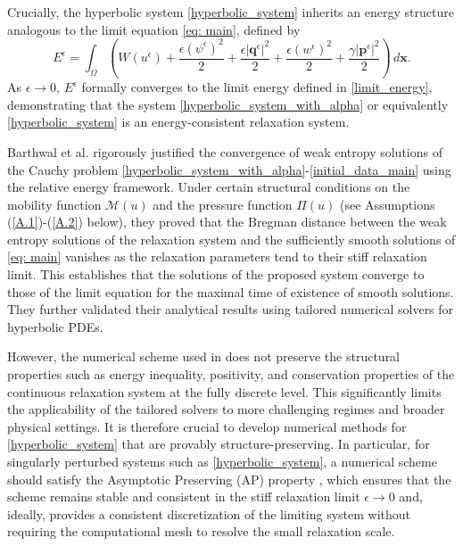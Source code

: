 \documentclass[11pt]{article}
\numberwithin{equation}{section}
\newtheorem{counter example}[theorem]{Counter Example}
\numberwithin{equation}{section}
\numberwithin{equation}{section}
\newcommand{\rel}{^{\epsilon}}
\begin{document}
Crucially, the hyperbolic system \eqref{hyperbolic_system} inherits an energy structure analogous to the limit equation \eqref{eq: main}, defined by 
\begin{equation}\label{convex-energy}
    E^{\epsilon} =\displaystyle\int_{\Omega} \left(W(u\rel)+\dfrac{\epsilon({\psi\rel})^2}{2}+\dfrac{\epsilon {|\mathbf{q}\rel|}^2}{2}+\dfrac{\epsilon (w\rel)^2}{2}+\dfrac{\gamma {|\mathbf{p}\rel|}^2}{2}\right)\, d\mathbf{x}. 
\end{equation}
As $\epsilon \to 0$, $E^{\epsilon}$ formally converges to the limit energy defined in \eqref{limit_energy}, demonstrating that the system \eqref{hyperbolic_system_with_alpha} or equivalently \eqref{hyperbolic_system} is an energy-consistent relaxation system. 

Barthwal et al. \cite{barthwal2026energy} rigorously justified the convergence of weak entropy solutions of the Cauchy problem \eqref{hyperbolic_system_with_alpha}-\eqref{initial_data_main} using the relative energy framework. Under certain structural conditions on the mobility function $\mathcal{M}(u)$ and the pressure function $\Pi(u)$ (see Assumptions (\ref{A.1})-(\ref{A.2}) below), they proved that the Bregman distance between the weak entropy solutions of the relaxation system and the sufficiently smooth solutions of \eqref{eq: main} vanishes as the relaxation parameters tend to their stiff relaxation limit. This establishes that the solutions of the proposed system converge to those of the limit equation for the maximal time of existence of smooth solutions. They further validated their analytical results using tailored numerical solvers for hyperbolic PDEs.

However, the numerical scheme used in \cite{barthwal2026energy} does not preserve the structural properties such as energy inequality, positivity, and conservation properties of the continuous relaxation system at the fully discrete level. This significantly limits the applicability of the tailored solvers to more challenging regimes and broader physical settings. It is therefore crucial to develop numerical methods for \eqref{hyperbolic_system} that are provably structure-preserving. In particular, for singularly perturbed systems such as \eqref{hyperbolic_system}, a numerical scheme should satisfy the Asymptotic Preserving (AP) property \cite{Jin99}, which ensures that the scheme remains stable and consistent in the stiff relaxation limit $\epsilon\to0$ and, ideally, provides a consistent discretization of the limiting system without requiring the computational mesh to resolve the small relaxation scale.
\end{document}
